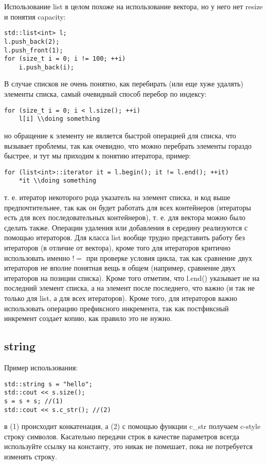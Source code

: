 Использование list в целом похоже на использование вектора, но у него нет resize и понятия capacity:
\begin{lstlisting}
std::list<int> l;
l.push_back(2);
l.push_front(1);
for (size_t i = 0; i != 100; ++i)
	i.push_back(i);
\end{lstlisting}
В случае списков не очень понятно, как перебирать (или еще хуже удалять) элементы списка, самый очевидный способ перебор по индексу:
\begin{lstlisting}
for (size_t i = 0; i < l.size(); ++i)
	l[i] \\doing something
\end{lstlisting}
но обращение к элементу не является быстрой операцией для списка, что вызывает проблемы, так как очевидно, что можно перебрать элементы гораздо быстрее, и тут
мы приходим к понятию итератора, пример:
\begin{lstlisting}
for (list<int>::iterator it = l.begin(); it != l.end(); ++it)
	*it \\doing something
\end{lstlisting}
т. е. итератор некоторого рода указатель на элемент списка, и код выше предпочтительнее, так как он будет работать для всех контейнеров (итераторы есть для всех
последовательных контейнеров), т. е. для вектора можно было сделать также. Операции удаления или добавления в середину реализуются с помощью итераторов. Для класса
list вообще трудно представить работу без итераторов (в отличие от вектора), кроме того для итераторов критично использовать именно $!=$ при проверке условия цикла,
так как сравнение двух итераторов не вполне понятная вещь в общем (например, сравнение двух итераторов на позиции списка). Кроме того отметим, что l.end() указывает
не на последний элемент списка, а на элемент после последнего, что важно (и так не только для list, а для всех итераторов). Кроме того, для итераторов важно
использовать операцию префиксного инкремента, так как постфиксный инкремент создает копию, как правило это не нужно.

\subsection{string}
Пример использования:
\begin{lstlisting}
std::string s = "hello";
std::cout << s.size();
s = s + s; //(1)
std::cout << s.c_str(); //(2)
\end{lstlisting}
в (1) происходит конкатенация, а (2) с помощью функции c\_str получаем c-style строку символов. Касательно передачи строк в качестве параметров всегда используйте
ссылку на константу, это никак не помешает, пока не потребуется изменять строку.

